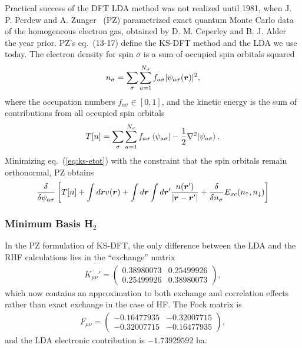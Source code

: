 Practical success of the DFT LDA method was not realized until 1981, when J. P. Perdew and A. Zunger~\cite{Perdew1981} (PZ) parametrized exact quantum Monte Carlo data of the homogeneous electron gas, obtained by D. M. Ceperley and B. J. Alder~\cite{Ceperley1980} the year prior. PZ's eq.~(13-17) define the KS-DFT method and the LDA we use today. The electron density for spin $\sigma$ is a sum of occupied spin orbitals squared
\begin{align}
n_{\sigma} = \sum\limits_{\sigma}\sum\limits_{a=1}^{N_{\sigma}}
f_{a\sigma} \vert\psi_{a\sigma}(\boldsymbol{r})\vert^2,
\end{align}
where the occupation numbers $f_{a\sigma}\in[0, 1]$, and the kinetic energy is the sum of contributions from all occupied spin orbitals
\begin{align}
T[n] = \sum\limits_\sigma\sum\limits_{a=1}^{N_{\sigma}}
f_{a\sigma} \braket{\psi_{a\sigma}|-\frac{1}{2}\nabla^2|\psi_{a\sigma}}.
\end{align}
Minimizing eq.~(\ref{eq:ks-etot}) with the constraint that the spin orbitals remain orthonormal, PZ obtains
\begin{align}
\dfrac{\delta}{\delta\psi_{a\sigma}} \left[
T[n] + \int d\boldsymbol{r}v(\boldsymbol{r}) + \int d\boldsymbol{r}\int d\boldsymbol{r}' \dfrac{n(\boldsymbol{r}')}{\vert\boldsymbol{r}-\boldsymbol{r}'\vert} +
\dfrac{\delta}{\delta n_{\sigma}} E_{xc}(n_{\uparrow},n_{\downarrow})
\right]
\end{align}

\subsubsection{Minimum Basis H$_2$}
In the PZ formulation of KS-DFT, the only difference between the LDA and the RHF calculations lies in the ``exchange'' matrix
\begin{align}
K_{\mu\nu}' = \left(\begin{array}{cc}
0.38980073 & 0.25499926 \\
0.25499926 & 0.38980073
\end{array}\right),
\end{align}
which now contains an approximation to both exchange and correlation effects rather than exact exchange in the case of HF. The Fock matrix is
\begin{align}
F_{\mu\nu} = \left(\begin{array}{cc}
-0.16477935 & -0.32007715 \\
-0.32007715 & -0.16477935
\end{array}\right),
\label{eq:h2-lda-fock-r14}
\end{align}
and the LDA electronic contribution is $-1.73929592$ ha.

